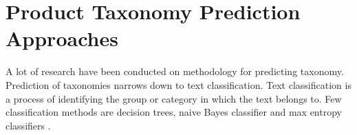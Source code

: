 

        






\section{Product Taxonomy Prediction Approaches}


A lot of research have been conducted on methodology for predicting taxonomy. Prediction of taxonomies narrows down to text classification. Text classification is a process of identifying the group or category in which the  text belongs to.  Few classification methods are decision trees, naive Bayes classifier and max entropy classifiers \parencite{BirdKleinLoper09}. 


